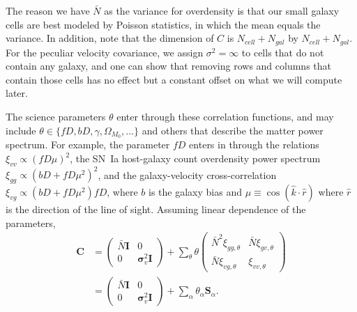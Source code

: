 \documentclass{article}
\begin{document}
The reason we have $\bar{N}$ as the variance for overdensity is that our small galaxy cells are best modeled by Poisson statistics, in which the mean equals the variance. In addition, note that the dimension of $C$ is $N_{cell}+N_{gal}$ by $N_{cell}+N_{gal}$. For the peculiar velocity covariance, we assign $\sigma^2=\infty$ to cells that do not contain any galaxy, and one can show that removing rows and columns that contain those cells has no effect but a constant offset on what we will compute later.


The science parameters $\theta$ enter through these correlation functions, and may include $\theta \in \{fD, bD, \gamma, \Omega_{M_0},\ldots\}$ and others
that describe the matter power spectrum.
For example, the parameter $fD$ enters in through the relations $\xi_{vv}\propto (fD\mu)^2$, the SN~Ia host-galaxy count overdensity
power spectrum $\xi_{g g }\propto (bD + fD\mu^2)^2$, and the galaxy-velocity cross-correlation $\xi_{vg}
\propto  (bD + fD\mu^2)fD$, where $b$ is the galaxy bias and $\mu\equiv \cos{(\hat{k} \cdot \hat{r})}$ where $\hat{r}$ is the direction of
the line of sight.  
Assuming linear dependence of the parameters,
\begin{align}
\textbf{C} 
&=
\left(
\begin{array}{cc}
\bar{N}\textbf{I} & 0 \nonumber \\
0 & \bm{\sigma}_v^2\textbf{I}
\end{array}
\right)
+ \sum_\theta \theta
\begin{pmatrix}
\bar{N}^2\xi_{gg,\theta} & \bar{N}\xi_{g v,\theta} \\
\bar{N}\xi_{v g,\theta} & \xi_{vv,\theta}
\end{pmatrix}\\
&=
\left(
\begin{array}{cc}
\bar{N}\textbf{I} & 0 \nonumber \\
0 & \bm{\sigma}_v^2\textbf{I}
\end{array}
\right)
+ \sum_\alpha \theta_\alpha \textbf{S}_\alpha .
\end{align} 

\end{document}
